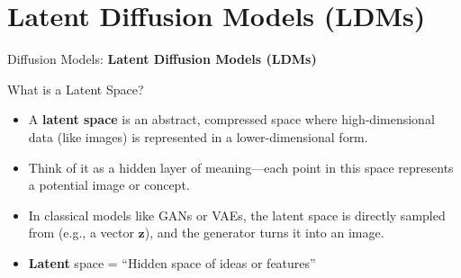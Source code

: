 \section{Latent Diffusion Models (LDMs)}
\begin{frame}{}
    \LARGE Diffusion Models: \textbf{Latent Diffusion Models (LDMs)}
\end{frame}

\begin{frame}[allowframebreaks]{What is a Latent Space?}
    \begin{figure}
        \centering
    \end{figure}
    \begin{itemize}
        \setlength{\itemsep}{-0.5em}
        \item A \textbf{latent space} is an abstract, compressed space where high-dimensional data (like images) is represented in a lower-dimensional form.
        \item Think of it as a hidden layer of meaning—each point in this space represents a potential image or concept.
        \item In classical models like GANs or VAEs, the latent space is directly sampled from (e.g., a vector $\mathbf{z}$), and the generator turns it into an image.
        \item \textbf{Latent} space = ``Hidden space of ideas or features''
    \end{itemize}
\end{frame}


